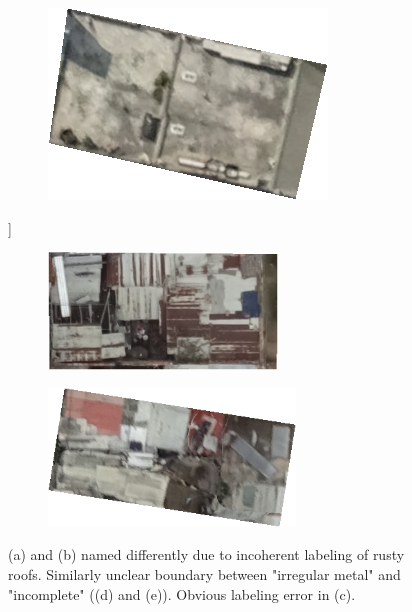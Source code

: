 \documentclass[11pt]{article}
\begin{document}
\begin{figure}
\begin{subfigure}[c]{0.27\textwidth}
		\end{subfigure}
		\begin{subfigure}[c]{0.27\textwidth}
			\centering
			\includegraphics[width=.9\textwidth]{figures/wrong_labels/hm_should_be_conc.png}
		\end{subfigure}
		\vspace{.3cm}]
		\begin{subfigure}[c]{0.35\textwidth}
			\centering
			\includegraphics[width=0.67\textwidth]{figures/wrong_labels/irr_holes.png}
		\end{subfigure}
		\begin{subfigure}[c]{0.35\textwidth}
			\centering		
			\includegraphics[width=0.72\textwidth]{figures/wrong_labels/inc_holes.png}
		\end{subfigure}
		\caption{(a) and (b) named differently due to incoherent labeling of rusty roofs. Similarly unclear boundary between "irregular metal" and "incomplete" ((d) and (e)). Obvious labeling error in (c).}
		\label{fig:ambiguities}
	\end{figure}
\end{document}
